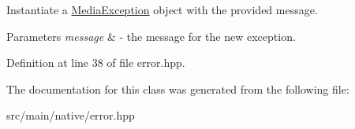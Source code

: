 Instantiate a \hyperlink{classtranscode_1_1MediaException}{MediaException} object with the provided message. 


\begin{DoxyParams}{Parameters}
{\em message} & -\/ the message for the new exception. \\
\hline
\end{DoxyParams}


Definition at line 38 of file error.hpp.



The documentation for this class was generated from the following file:\begin{DoxyCompactItemize}
\item 
src/main/native/error.hpp\end{DoxyCompactItemize}
